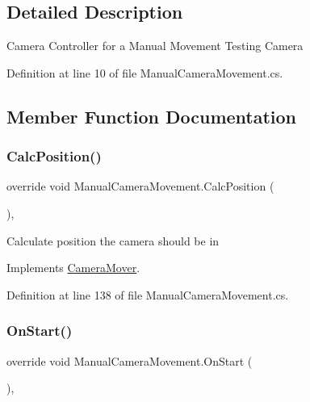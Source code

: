 \subsection{Detailed Description}
Camera Controller for a Manual Movement Testing Camera 



Definition at line 10 of file Manual\+Camera\+Movement.\+cs.



\subsection{Member Function Documentation}
\mbox{\label{class_manual_camera_movement_af39bcaa57f616ec5003c1848deefb087}} 
\subsubsection{\texorpdfstring{Calc\+Position()}{CalcPosition()}}
{\footnotesize\ttfamily override void Manual\+Camera\+Movement.\+Calc\+Position (\begin{DoxyParamCaption}{ }\end{DoxyParamCaption})\hspace{0.3cm}{\ttfamily [protected]}, {\ttfamily [virtual]}}



Calculate position the camera should be in 



Implements \mbox{\hyperlink{class_camera_mover_afe44c2188d44a3fdb72acdf0d12563a9}{Camera\+Mover}}.



Definition at line 138 of file Manual\+Camera\+Movement.\+cs.

\mbox{\label{class_manual_camera_movement_a7d176cf631d84d7c34b2407fd810adcf}} 
\subsubsection{\texorpdfstring{On\+Start()}{OnStart()}}
{\footnotesize\ttfamily override void Manual\+Camera\+Movement.\+On\+Start (\begin{DoxyParamCaption}{ }\end{DoxyParamCaption})\hspace{0.3cm}{\ttfamily [protected]}, {\ttfamily [virtual]}}



